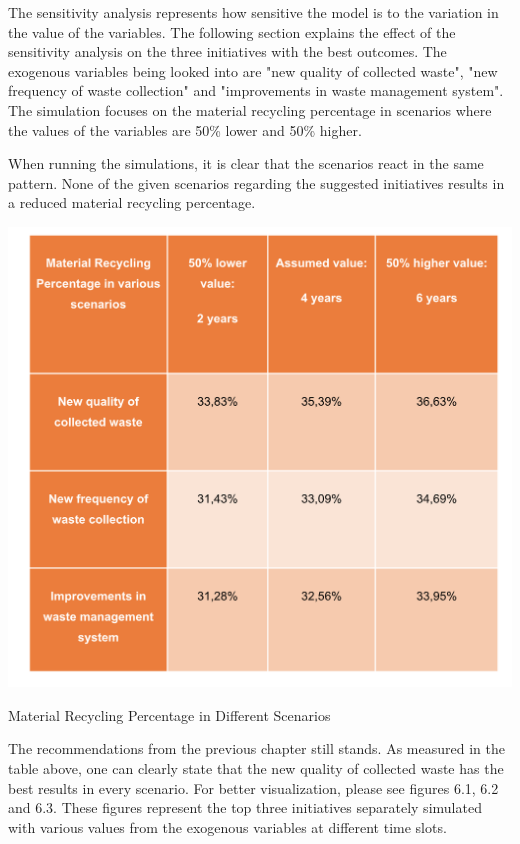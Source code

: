 The sensitivity analysis represents how sensitive the model is to the variation in the value of the variables. The following section explains the effect of the sensitivity analysis on the three initiatives with the best outcomes. The exogenous variables being looked into are "new quality of collected waste", "new frequency of waste collection" and "improvements in waste management system". The simulation focuses on the material recycling percentage in scenarios where the values of the variables are 50\% lower and 50\% higher. 

\indent \newline
When running the simulations, it is clear that the scenarios react in the same pattern. None of the given scenarios regarding the suggested initiatives results in a reduced material recycling percentage.

\begin{table}[H]
\centering
\includegraphics [scale=0.40,angle=360]{tables/scenarios.png}
\caption{Material Recycling Percentage in Different Scenarios}
\label{tbl:scenarios}
\end{table}

\indent \newline
The recommendations from the previous chapter still stands. As measured in the table above, one can clearly state that the new quality of collected waste has the best results in every scenario. For better visualization, please see figures 6.1, 6.2 and 6.3. These figures represent the top three initiatives separately simulated with various values from the exogenous variables at different time slots. 

